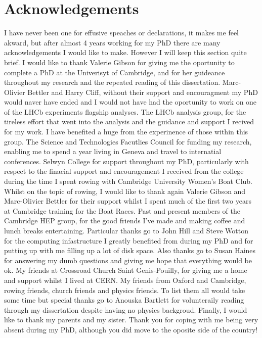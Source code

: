 




\chapter{Acknowledgements}

I have never been one for effusive speaches or declarations, it makes me feel akward, but after almost 4 years working for my PhD there are many acknowledgements I would like to make. However I will keep this section quite brief.
I would like to thank Valerie Gibson for giving me the oportunity to complete a PhD at the Univerisyt of Cambridge, and for her guideance throughout my research and the repeated reading of this dissertation. %
Marc-Olivier Bettler and Harry Cliff, without their support and encouragment my PhD would naver have ended and I would not have had the oportunity to work on one of the LHCb experiments flagship analyses.
The \bmumu LHCb analysis group, for the tireless effort that went into the \BF analysis and the guidance and support I recived for my work. I have benefited a huge from the experinence of those within this group. 
The Science and Technologies Facutlies Council for funding my research, enabling me to spend a year living in Geneva and travel to internatial conferences. Selwyn College for support throughout my PhD, particularly with respect to the finacial support and encouragement I received from the college during the time I spent rowing with Cambridge University Women's Boat Club. Whilst on the topic of rowing, I would like to thank again Valerie Gibson and Marc-Olivier Bettler for their support whilst I spent much of the first two years at Cambridge training for the Boat Races. 
Past and present members of the Cambridge HEP group, for the good friends I've made and making coffee and lunch breaks entertaining. Particular thanks go to John Hill and Steve Wotton for the computing infastructure I greatly benefited from during my PhD and for putting up with me filling up a lot of disk space. Also thanks go to Susan Haines for answering my dumb questions and giving me hope that everything would be ok. 
My friends at Crossroad Church Saint Genis-Pouilly, for giving me a home and support whilst I lived at CERN.
My friends from Oxford and Cambridge, rowing friends, church friends and physics friends. To list them all would take some time but special thanks go to Anouska Bartlett for volunteraily reading through my dissertation despite having no physics backgroud. 
Finally, I would like to thank my parents and my sister. Thank you for coping with me being very absent during my PhD, although you did move to the oposite side of the country! 

